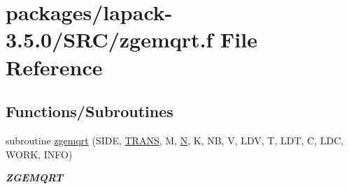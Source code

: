 \hypertarget{zgemqrt_8f}{}\section{packages/lapack-\/3.5.0/\+S\+R\+C/zgemqrt.f File Reference}
\label{zgemqrt_8f}
\subsection*{Functions/\+Subroutines}
\begin{DoxyCompactItemize}
\item 
subroutine \hyperlink{group__complex16GEcomputational_ga2f7eb86e8b8054f4167972eff1fb1131}{zgemqrt} (S\+I\+D\+E, \hyperlink{superlu__enum__consts_8h_a0c4e17b2d5cea33f9991ccc6a6678d62a1f61e3015bfe0f0c2c3fda4c5a0cdf58}{T\+R\+A\+N\+S}, M, \hyperlink{polmisc_8c_a0240ac851181b84ac374872dc5434ee4}{N}, K, N\+B, V, L\+D\+V, T, L\+D\+T, C, L\+D\+C, W\+O\+R\+K, I\+N\+F\+O)
\begin{DoxyCompactList}\small\item\em {\bfseries Z\+G\+E\+M\+Q\+R\+T} \end{DoxyCompactList}\end{DoxyCompactItemize}
